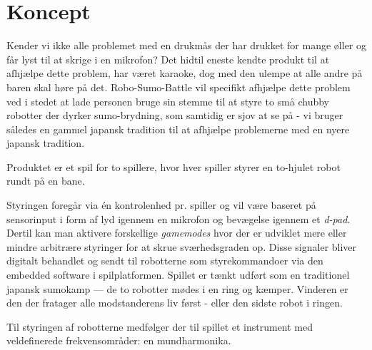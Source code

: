 \section{Koncept}
 Kender vi ikke alle problemet med en drukmås der har drukket for mange øller og får lyst til at skrige i en mikrofon? Det hidtil eneste kendte produkt til at afhjælpe dette problem, har været karaoke, dog med den ulempe at alle andre på baren skal høre på det. Robo-Sumo-Battle vil specifikt afhjælpe dette problem ved i stedet at lade personen bruge sin stemme til at styre to små chubby robotter der dyrker sumo-brydning, som samtidig er sjov at se på - vi bruger således en gammel japansk tradition til at afhjælpe problemerne med en nyere japansk tradition. 

Produktet er et spil for to spillere, hvor hver spiller styrer en to-hjulet robot rundt på en bane.



Styringen foregår via én kontrolenhed pr. spiller og vil være baseret på sensorinput i form af lyd igennem en mikrofon og bevægelse igennem et \textit{d-pad}. Dertil kan man aktivere forskellige \textit{gamemodes} hvor der er udviklet mere eller mindre arbitrære styringer for at skrue sværhedsgraden op. 
Disse signaler bliver digitalt behandlet og sendt til robotterne som styrekommandoer via den embedded software i spilplatformen.
Spillet er tænkt udført som en traditionel japansk sumokamp --- de to robotter mødes i en ring og kæmper. Vinderen er den der fratager alle modstanderens liv først - eller den sidste robot i ringen.



Til styringen af robotterne medfølger der til spillet et instrument med veldefinerede frekvensområder: en mundharmonika.
\tbd




